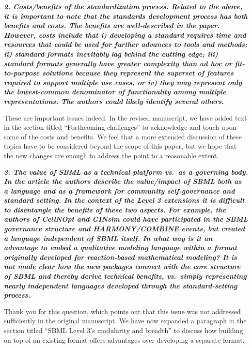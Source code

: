 \documentclass[11pt]{mhletter}
\begin{document}
\textbf{\textit{2. Costs/benefits of the standardization process. Related to the above, it is important to note that the standards development process has both benefits and costs. The benefits are well-described in the paper. However, costs include that i) developing a standard requires time and resources that could be used for further advances to tools and methods; ii) standard formats inevitably lag behind the cutting edge; iii) standard formats generally have greater complexity than ad hoc or fit-to-purpose solutions because they represent the superset of features required to support multiple use cases, or iv) they may represent only the lowest-common denominator of functionality among multiple representations. The authors could likely identify several others.}}

These are important issues indeed.  In the revised manuscript, we have added text in the section titled ``Forthcoming challenges'' to acknowledge and touch upon some of the costs and benefits.  We feel that a more extended discussion of these topics have to be considered beyond the scope of this paper, but we hope that the new changes are enough to address the point to a reasonable extent.


\textbf{\textit{3. The value of SBML as a technical platform vs.\ as a governing body.  In the article the authors describe the value/impact of SBML both as a language and as a framework for community self-governance and standard setting. In the context of the Level 3 extensions it is difficult to disentangle the benefits of these two aspects. For example, the authors of CellNOpt and GINsim could have participated in the SBML governance structure and HARMONY/COMBINE events, but created a language independent of SBML itself. In what way is it an advantage to embed a qualitative modeling language within a format originally developed for reaction-based mathematical modeling? It is not made clear how the new packages connect with the core structure of SBML and thereby derive technical benefits, vs.\ simply representing nearly independent languages developed through the standard-setting process.}}

Thank you for this question, which points out that this issue was not addressed sufficiently in the original manuscript.  We have now expanded a paragraph in the section titled ``SBML Level 3's modularity and breadth'' to discuss how building on top of an existing format offers advantages over developing a separate format.
\end{document}
